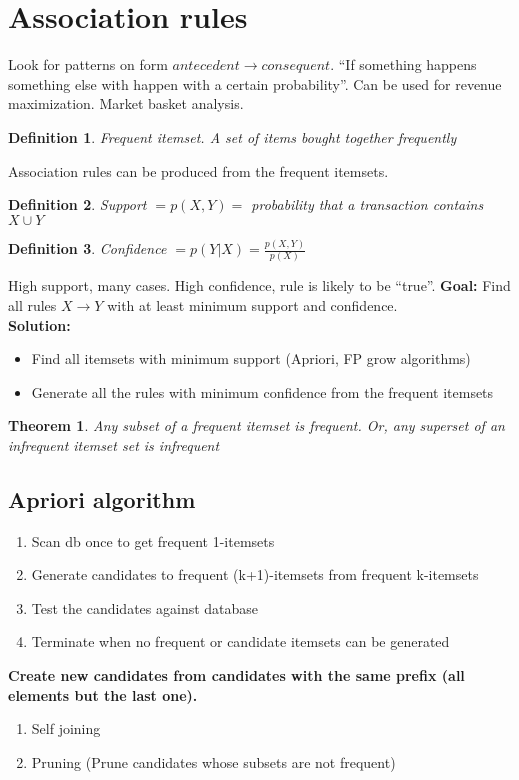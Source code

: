 \documentclass[a4paper]{article}
\newtheorem{definition}{Definition}
\newtheorem{theorem}{Theorem}
\begin{document}
\section{Association rules}
Look for patterns on form $antecedent \rightarrow consequent$. ``If something
happens something else with happen with a certain probability''. Can be used for
revenue maximization. Market basket analysis.
\begin{definition}
		Frequent itemset. A set of items bought together frequently
\end{definition}
Association rules can be produced from the frequent itemsets.
\begin{definition}
		Support $= p(X,Y) =$ probability that a transaction contains $X\cup Y$
\end{definition}
\begin{definition}
		Confidence $= p(Y|X) = \frac{p(X,Y)}{p(X)}$
\end{definition}
High support, many cases. High confidence, rule is likely to be ``true''.
\textbf{Goal:} Find all rules $X\rightarrow Y$ with at least minimum support and
confidence.\\
\textbf{Solution:}
\begin{itemize}
		\item Find all itemsets with minimum support (Apriori, FP grow
				algorithms)
		\item Generate all the rules with minimum confidence from the frequent
				itemsets
\end{itemize}

\begin{theorem}
		Any subset of a frequent itemset is frequent. Or, any superset of an
		infrequent itemset set is infrequent
\end{theorem}
\subsection{Apriori algorithm}
\begin{enumerate}
		\item Scan db  once to get frequent 1-itemsets
		\item Generate candidates to frequent (k+1)-itemsets from frequent
				k-itemsets
		\item Test the candidates against database
		\item Terminate when no frequent or candidate itemsets can be generated
\end{enumerate}
\textbf{Create new candidates from candidates with the same prefix (all elements but the last
one).}\\
\begin{enumerate}
		\item Self joining
		\item Pruning (Prune candidates whose subsets are not frequent)
\end{enumerate}
\end{document}
